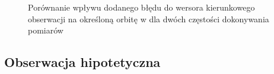 \begin{figure}%
    \centering
    \qquad
    \caption{Porównanie wpływu dodanego błędu do wersora kierunkowego obserwacji na określoną orbitę w dla dwóch częstości dokonywania pomiarów}%
    \label{fig:szum_side_by_side}%
\end{figure}

\FloatBarrier
\subsection{Obserwacja hipotetyczna}

